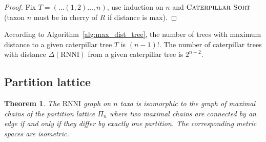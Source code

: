 \documentclass{amsart}
\newcommand{\rnni}{\mathrm{RNNI}}
\newcommand{\csort}{\textsc{Caterpillar Sort}}
\newtheorem{theorem}[definition]{Theorem}
\begin{document}
\begin{proof}
    Fix $T = (\ldots(1,2) \ldots ,n)$, use induction on $n$ and $\csort$ (taxon $n$ must be in cherry of $R$ if distance is max).
\end{proof}

According to Algorithm~\ref{alg:max_dist_tree}, the number of trees with maximum distance to a given caterpillar tree $T$ is $(n-1)!$.
The number of caterpillar trees with distance $\Delta(\rnni)$ from a given caterpillar tree is $2^{n-2}$.


\subsection{Partition lattice}


\begin{theorem}
The $\rnni$ graph on $n$ taxa is isomorphic to the graph of maximal chains of the partition lattice $\Pi_n$ where two maximal chains are connected by an edge if and only if they differ by exactly one partition.
The corresponding metric spaces are isometric.
\end{theorem}


\printbibliography
\end{document}
